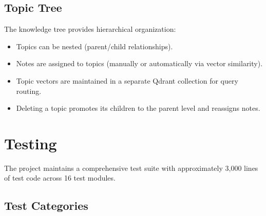 \documentclass[12pt,a4paper]{article}
\begin{document}
\subsection{Topic Tree}

The knowledge tree provides hierarchical organization:
\begin{itemize}[nosep]
    \item Topics can be nested (parent/child relationships).
    \item Notes are assigned to topics (manually or automatically via vector similarity).
    \item Topic vectors are maintained in a separate Qdrant collection for query routing.
    \item Deleting a topic promotes its children to the parent level and reassigns notes.
\end{itemize}

\section{Testing}
\label{sec:testing}

The project maintains a comprehensive test suite with approximately 3,000 lines of test code across 16 test modules.

\subsection{Test Categories}
\end{document}
